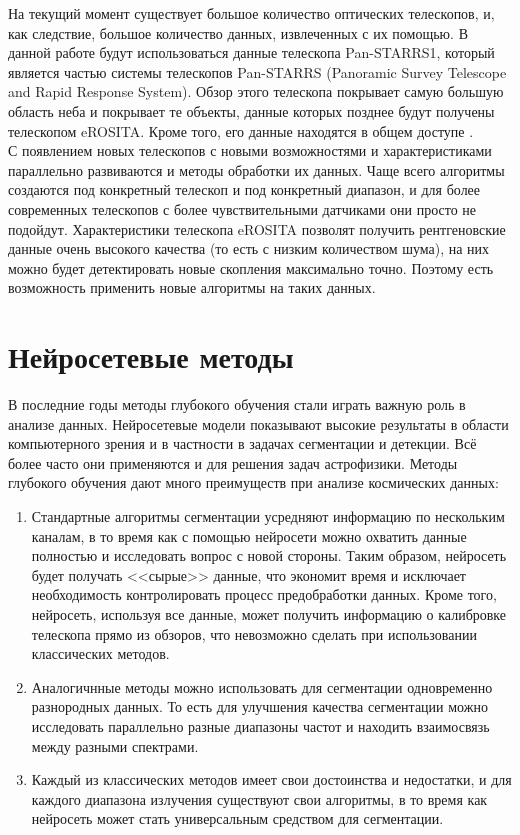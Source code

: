 На текущий момент существует большое количество 
оптических телескопов, и, как следствие, большое количество данных, извлеченных с их помощью. В 
данной работе будут использоваться данные телескопа Pan-STARRS1, который является частью системы 
телескопов Pan-STARRS (Panoramic Survey Telescope and Rapid Response System). Обзор этого телескопа
покрывает самую большую область неба и покрывает те объекты, данные которых позднее будут получены 
телескопом eROSITA. Кроме того, его данные находятся в общем доступе \cite{Panstarrs}.\\

С появлением новых телескопов с новыми возможностями и характеристиками параллельно развиваются и 
методы обработки их данных. Чаще всего алгоритмы создаются под конкретный телескоп и под конкретный 
диапазон, и для более современных телескопов с более чувствительными датчиками они просто не подойдут.
Характеристики телескопа eROSITA позволят получить рентгеновские данные 
очень высокого качества (то есть с низким количеством шума), на них можно будет детектировать новые
скопления максимально точно. Поэтому есть возможность применить новые алгоритмы на таких данных.\\


\section{Нейросетевые методы}
В последние годы методы глубокого обучения стали играть важную роль в анализе данных. Нейросетевые 
модели показывают высокие результаты в области компьютерного зрения и в частности в задачах 
сегментации и детекции. Всё более часто они применяются и для решения задач астрофизики. Методы 
глубокого обучения дают много преимуществ при анализе космических данных: 

\begin{enumerate}
    \item Стандартные алгоритмы сегментации усредняют информацию по нескольким каналам,
        в то время как с помощью нейросети можно охватить данные полностью и исследовать вопрос с 
        новой стороны. Таким образом, нейросеть будет получать <<сырые>> данные, что экономит время 
        и исключает необходимость контролировать процесс предобработки данных. 
        Кроме того, нейросеть, используя все данные, может получить информацию о 
        калибровке телескопа прямо из обзоров, что невозможно сделать при использовании классических 
        методов.
    \item Аналогичнные методы можно использовать для сегментации одновременно разнородных данных. 
        То есть для улучшения качества сегментации можно исследовать параллельно разные диапазоны 
        частот и находить взаимосвязь между разными спектрами.
    \item Каждый из классических методов имеет свои достоинства и недостатки, и для каждого 
        диапазона излучения существуют свои алгоритмы, в то время как 
        нейросеть может стать универсальным средством для сегментации.
\end{enumerate}

